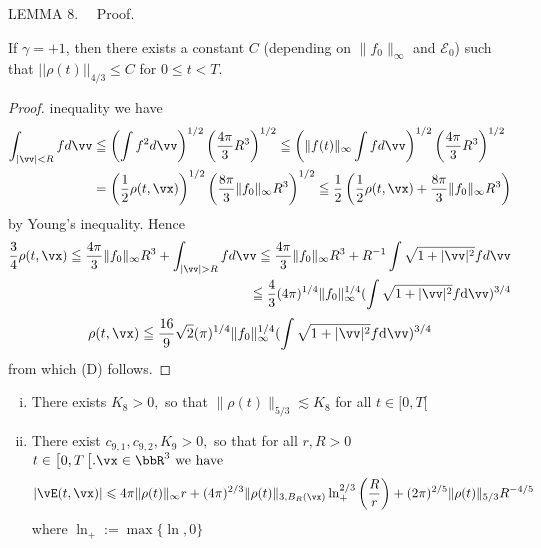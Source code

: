 LEMMA $8 . \quad$ 
Proof. 



\begin{proposition}
    If $\gamma=+1$, then there exists a constant $C$ (depending on $\|f_0\|_{\infty}$ and $\mathscr{E}_0$) such that $||\rho(t)||_{4/3}\leq C$ for $0 \leq t < T$.
\end{proposition}
\begin{proof}
    inequality we have
    \[
    \begin{aligned}
    \int_{|\vv|<R} f d \vv & \leqq\left(\int f^{2} d \vv\right)^{1 / 2}\left(\frac{4 \pi}{3} R^{3}\right)^{1 / 2} \leqq\left(\|f(t)\|_{\infty} \int f d \vv\right)^{1 / 2}\left(\frac{4 \pi}{3} R^{3}\right)^{1 / 2} \\
    &=\left(\frac{1}{2} \rho(t, \vx)\right)^{1 / 2}\left(\frac{8 \pi}{3}\|f_0\|_{\infty} R^{3}\right)^{1 / 2} \leqq \frac{1}{2} \left(\frac{1}{2} \rho(t, \vx)+\frac{8 \pi}{3}\|f_0\|_{\infty} R^{3} \right)
    \end{aligned}
    \]
    by Young's inequality. Hence
    \[
      \begin{aligned}
        \frac{3}{4} \rho(t, \vx) \leqq \frac{4\pi}{3}\|f_0\|_{\infty} R^{3}+\int_{|\vv|>R} f d \vv \leqq \frac{4 \pi}{3}\|f_0\|_{\infty} R^{3}+R^{-1} \int \sqrt{1+|\vv|^{2}} f d \vv \\
        \leqq \frac{4}{3} (4\pi)^{1/4} \|f_0\|^{1/4}_{\infty} (\int \sqrt{1+|\vv|^2} f \mathrm{d} \vv)^{3/4}
      \end{aligned}
    \]
    $$ \rho(t, \vx) 
    \leqq \frac{16}{9} \sqrt{2} (\pi)^{1/4} \|f_0\|^{1/4}_{\infty} (\int \sqrt{1+|\vv|^2} f \mathrm{d} \vv)^{3/4}$$
    from which (D) follows.
\end{proof}


\begin{lemma}
    \begin{enumerate}[(i)]
        \item There exists $K_{8}>0,$ so that $\|\rho(t)\|_{5 / 3} \lesssim K_{8}$ for all $t \in[0, T[$
        \item There exist $c_{9,1}, c_{9,2}, K_{9}>0,$ so that for all $r, R>0$ $t \in\left[0, T\left[. \vx \in \bbR^{3}\text { we have }\right.\right.$
        \[
        |\vE(t, \vx)| \leqslant 4 \pi\|\rho(t)\|_{\infty} r+(4 \pi)^{2 / 3}\|\rho(t)\|_{3, B_{R}(\vx)} \ln_{+}^{2 / 3}\left(\frac{R}{r}\right) +(2 \pi)^{2 / 5}\|\rho(t)\|_{5 / 3} R^{-4 / 5}
        \]
        where $\ln _{+}:=\max \{\ln , 0\}$
    \end{enumerate}
\end{lemma}

